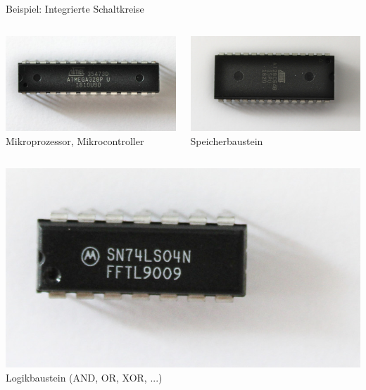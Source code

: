 {
\small

\begin{frame}{Beispiel: Integrierte Schaltkreise}
    \begin{columns}
        \includegraphics[width=.8\textwidth]{2-hardwaredesign/img/komponenten_ic_prozessor} \\
        Mikroprozessor, Mikrocontroller

        \includegraphics[width=.8\textwidth]{2-hardwaredesign/img/komponenten_ic_speicher} \\
        Speicherbaustein
    \end{columns}

    \bigskip

    \begin{columns}
        \includegraphics[width=.8\textwidth]{2-hardwaredesign/img/komponenten_ic_logikgatter} \\
        Logikbaustein (AND, OR, XOR, ...)


\end{columns}
\end{frame}}

